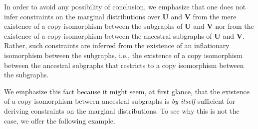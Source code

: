 {In order to avoid any possibility of conclusion, we emphasize that one does not infer constraints on the marginal distributions over $\bm{U}$ and $\bm{V}$ from the mere existence of a copy isomorphism between the subgraphs of $\bm{U}$ and $\bm{V}$ nor from the existence of a copy isomorphism between the ancestral subgraphs of $\bm{U}$ and $\bm{V}$.   Rather, such constraints are inferred from the existence of an inflationary isomorphism between the subgraphs, i.e., the existence of a copy isomorphism between the ancestral subgraphs that restricts to a copy isomorphism between the subgraphs.  

We emphasize this fact because it might seem, at first glance, that the existence of a copy isomorphism between ancestral subgraphs is {\em by itself} sufficient for deriving constraints on the marginal distributions.  To see why this is not the case, we offer the following example.

}

